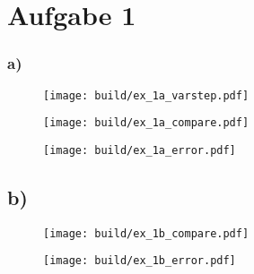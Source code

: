 \section*{Aufgabe 1}
\subsubsection{a)}
\begin{figure}
    \centering
    \texttt{[image: build/ex\_1a\_varstep.pdf]}
\end{figure}

\begin{figure}
    \centering
    \texttt{[image: build/ex\_1a\_compare.pdf]}
\end{figure}

\begin{figure}
    \centering
    \texttt{[image: build/ex\_1a\_error.pdf]}
\end{figure}
\FloatBarrier
\subsection{b)}
\begin{figure}
    \centering
    \texttt{[image: build/ex\_1b\_compare.pdf]}
\end{figure}

\begin{figure}
    \centering
    \texttt{[image: build/ex\_1b\_error.pdf]}
\end{figure}
\FloatBarrier